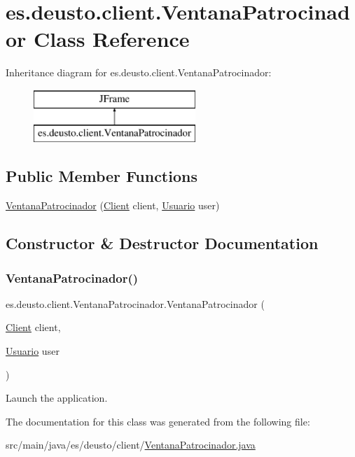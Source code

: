\hypertarget{classes_1_1deusto_1_1client_1_1_ventana_patrocinador}{}\section{es.\+deusto.\+client.\+Ventana\+Patrocinador Class Reference}
\label{classes_1_1deusto_1_1client_1_1_ventana_patrocinador}
Inheritance diagram for es.\+deusto.\+client.\+Ventana\+Patrocinador\+:\begin{figure}[H]
\begin{center}
\leavevmode
\includegraphics[height=2.000000cm]{classes_1_1deusto_1_1client_1_1_ventana_patrocinador}
\end{center}
\end{figure}
\subsection*{Public Member Functions}
\begin{DoxyCompactItemize}
\item 
\mbox{\hyperlink{classes_1_1deusto_1_1client_1_1_ventana_patrocinador_a65d64a55d9a2790e06b115695738e04d}{Ventana\+Patrocinador}} (\mbox{\hyperlink{classes_1_1deusto_1_1client_1_1_client}{Client}} client, \mbox{\hyperlink{classes_1_1deusto_1_1server_1_1jdo_1_1_usuario}{Usuario}} user)
\end{DoxyCompactItemize}


\subsection{Constructor \& Destructor Documentation}
\mbox{\label{classes_1_1deusto_1_1client_1_1_ventana_patrocinador_a65d64a55d9a2790e06b115695738e04d}} 
\subsubsection{\texorpdfstring{VentanaPatrocinador()}{VentanaPatrocinador()}}
{\footnotesize\ttfamily es.\+deusto.\+client.\+Ventana\+Patrocinador.\+Ventana\+Patrocinador (\begin{DoxyParamCaption}\item[{\mbox{\hyperlink{classes_1_1deusto_1_1client_1_1_client}{Client}}}]{client,  }\item[{\mbox{\hyperlink{classes_1_1deusto_1_1server_1_1jdo_1_1_usuario}{Usuario}}}]{user }\end{DoxyParamCaption})}

Launch the application. 

The documentation for this class was generated from the following file\+:\begin{DoxyCompactItemize}
\item 
src/main/java/es/deusto/client/\mbox{\hyperlink{_ventana_patrocinador_8java}{Ventana\+Patrocinador.\+java}}\end{DoxyCompactItemize}
